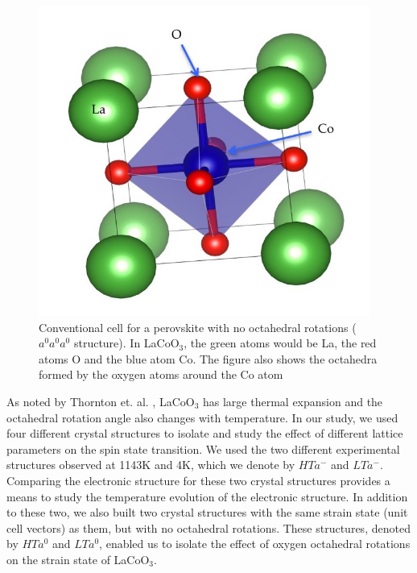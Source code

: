 \documentclass[10pt]{ruthesis}
\begin{document}
{\begin{figure}[H]
 \begin{center}
 \includegraphics[height=4in]{plots_final/supplement_plots/perovskite_struct}
 \caption{Conventional cell for a perovskite with no octahedral rotations ($a^0a^0a^0$ structure). In LaCoO$_3$, the green atoms would be 
La, the red atoms O and the blue atom Co. The figure also shows the octahedra formed by the oxygen atoms around the Co atom}\label{Perov_struct}
\end{center}
\end{figure}


As noted by Thornton et. al. \cite{Thornton}, LaCoO$_3$ has large thermal expansion and the octahedral rotation angle also changes with temperature. In our study, we used four different crystal structures to isolate and study the effect of different lattice parameters on the spin state transition. We used the two different experimental structures observed at 1143K and 4K, which we denote by $HTa^-$ and $LTa^-$. Comparing the electronic structure for these two crystal structures provides a means to study the temperature evolution of the electronic structure. In addition to these two, we also built two crystal structures with the same strain state (unit cell vectors) as them, but with no octahedral rotations. These structures, denoted by $HTa^0$ and $LTa^0$, enabled us to isolate the effect of oxygen octahedral rotations on the strain state of LaCoO$_3$. 

}
\end{document}
